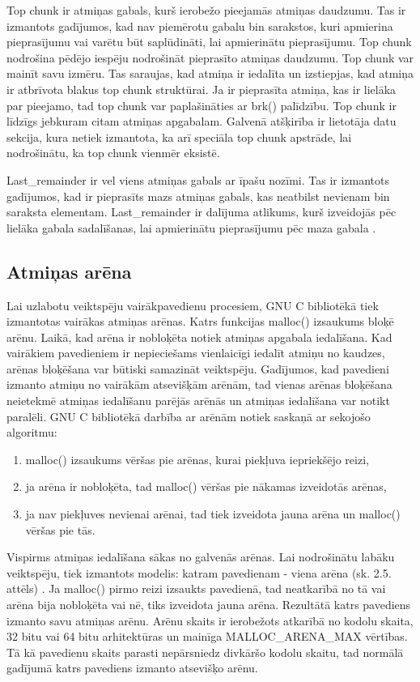 Top chunk ir atmiņas gabals, kurš ierobežo pieejamās atmiņas daudzumu.
Tas ir izmantots gadījumos, kad nav piemērotu gabalu bin sarakstos, kuri apmierina pieprasījumu vai varētu būt saplūdināti, lai apmierinātu pieprasījumu.
Top chunk nodrošina pēdējo iespēju nodrošināt pieprasīto atmiņas daudzumu.
Top chunk var mainīt savu izmēru. Tas saraujas, kad atmiņa ir iedalīta un izstiepjas, kad atmiņa ir atbrīvota blakus top chunk struktūrai. 
Ja ir pieprasīta atmiņa, kas ir lielāka par pieejamo, tad top chunk var paplašināties ar brk() palīdzību.
Top chunk ir līdzīgs jebkuram citam atmiņas apgabalam. 
Galvenā atšķirība ir lietotāja datu sekcija, kura netiek izmantota, ka arī speciāla top chunk apstrāde, lai nodrošinātu, ka top chunk vienmēr eksistē.

Last\_remainder ir vel viens atmiņas gabals ar īpašu nozīmi.
Tas ir izmantots gadījumos, kad ir pieprasīts mazs atmiņas gabals, kas neatbilst nevienam bin saraksta elementam. 
Last\_remainder ir dalījuma atlikums, kurš izveidojās pēc lielāka gabala sadalīšanas, lai apmierinātu pieprasījumu pēc maza gabala  \cite {BLACKHAT}.

\subsection{Atmiņas arēna}
Lai uzlabotu veiktspēju vairākpavedienu procesiem, GNU C bibliotēkā tiek izmantotas vairākas atmiņas arēnas. 
Katrs funkcijas malloc() izsaukums bloķē arēnu. Laikā, kad arēna ir nobloķēta notiek atmiņas apgabala iedalīšana.
Kad vairākiem pavedieniem ir nepieciešams vienlaicīgi iedalīt atmiņu no kaudzes, arēnas bloķēšana var būtiski samazināt veiktspēju.
Gadījumos, kad pavedieni izmanto atmiņu no vairākām atsevišķām arēnām, tad vienas arēnas bloķēšana neietekmē atmiņas iedalīšanu parējās arēnās un atmiņas iedalīšana var notikt paralēli.
GNU C bibliotēkā darbība ar arēnām notiek saskaņā ar sekojošo algoritmu: 

\begin{enumerate}
\item malloc() izsaukums vēršas pie arēnas, kurai piekļuva iepriekšējo reizi,
\item ja arēna ir nobloķēta, tad malloc() vēršas pie nākamas izveidotās arēnas,
\item ja nav piekļuves nevienai arēnai, tad tiek izveidota jauna arēna un malloc() vēršas pie tās.
\end{enumerate}

Vispirms atmiņas iedalīšana sākas no galvenās arēnas. 
Lai nodrošinātu labāku veiktspēju, tiek izmantots modelis: katram pavedienam - viena arēna (sk. 2.5. attēls) \cite{JCFVO}. 
Ja malloc() pirmo reizi izsaukts pavedienā, tad neatkarībā no tā vai arēna bija nobloķēta vai nē, tiks izveidota jauna arēna.
Rezultātā katrs pavediens izmanto savu atmiņas arēnu. 
Arēnu skaits ir ierobežots atkarībā no kodolu skaita, 32 bitu vai 64 bitu arhitektūras un mainīga MALLOC\_ARENA\_MAX vērtības.
Tā kā pavedienu skaits parasti nepārsniedz divkāršo kodolu skaitu, tad normālā gadījumā katrs pavediens izmanto atsevišķo arēnu. 

